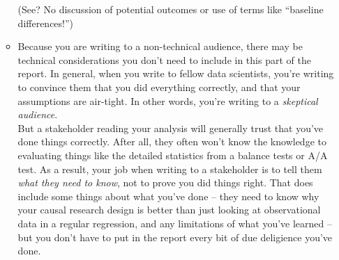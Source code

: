 \documentclass[12pt]{article}
\begin{document}
\begin{enumerate}
\begin{itemize}
        (See? No discussion of potential outcomes or use of terms like ``baseline differences!'')
        \item Because you are writing to a non-technical audience, there may be technical considerations you don't need to include in this part of the report. In general, when you write to fellow data scientists, you're writing to convince them that you did everything correctly, and that your assumptions are air-tight. In other words, you're writing to a \emph{skeptical audience}. \\
        But a stakeholder reading your analysis will generally trust that you've done things correctly. After all, they often won't know the knowledge to evaluating things like the detailed statistics from a balance tests or A/A test. As a result, your job when writing to a stakeholder is to tell them \emph{what they need to know}, not to prove you did things right. That does include some things about what you've done -- they need to know why your causal research design is better than just looking at observational data in a regular regression, and any limitations of what you've learned -- but you don't have to put in the report every bit of due deligience you've done. 
    \end{itemize} 
\end{enumerate}
\end{document}
